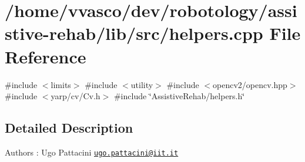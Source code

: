 \section{/home/vvasco/dev/robotology/assistive-\/rehab/lib/src/helpers.cpp File Reference}
\label{helpers_8cpp}
{\ttfamily \#include $<$limits$>$}\newline
{\ttfamily \#include $<$utility$>$}\newline
{\ttfamily \#include $<$opencv2/opencv.\+hpp$>$}\newline
{\ttfamily \#include $<$yarp/cv/\+Cv.\+h$>$}\newline
{\ttfamily \#include \char`\"{}Assistive\+Rehab/helpers.\+h\char`\"{}}\newline


\subsection{Detailed Description}
\begin{DoxyAuthor}{Authors}
\+: Ugo Pattacini \href{mailto:ugo.pattacini@iit.it}{\tt ugo.\+pattacini@iit.\+it} 
\end{DoxyAuthor}
